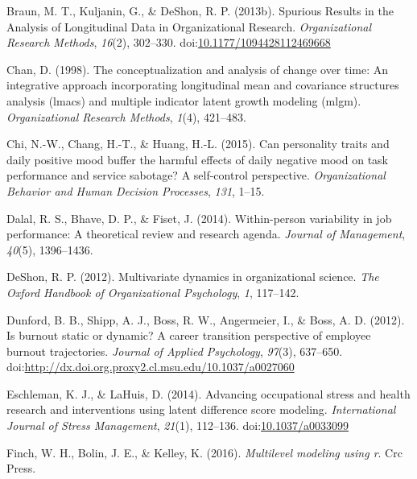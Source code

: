 \documentclass[english,,man]{apa6}
\theoremstyle{definition}
\theoremstyle{definition}
\theoremstyle{definition}
\theoremstyle{remark}
\begin{document}
\leavevmode\hypertarget{ref-braun_spurious_2013}{}%
Braun, M. T., Kuljanin, G., \& DeShon, R. P. (2013b). Spurious Results
in the Analysis of Longitudinal Data in Organizational Research.
\emph{Organizational Research Methods}, \emph{16}(2), 302--330.
doi:\href{https://doi.org/10.1177/1094428112469668}{10.1177/1094428112469668}

\leavevmode\hypertarget{ref-chan1998conceptualization}{}%
Chan, D. (1998). The conceptualization and analysis of change over time:
An integrative approach incorporating longitudinal mean and covariance
structures analysis (lmacs) and multiple indicator latent growth
modeling (mlgm). \emph{Organizational Research Methods}, \emph{1}(4),
421--483.

\leavevmode\hypertarget{ref-chi_can_2015}{}%
Chi, N.-W., Chang, H.-T., \& Huang, H.-L. (2015). Can personality traits
and daily positive mood buffer the harmful effects of daily negative
mood on task performance and service sabotage? A self-control
perspective. \emph{Organizational Behavior and Human Decision
Processes}, \emph{131}, 1--15.

\leavevmode\hypertarget{ref-dalal2014within}{}%
Dalal, R. S., Bhave, D. P., \& Fiset, J. (2014). Within-person
variability in job performance: A theoretical review and research
agenda. \emph{Journal of Management}, \emph{40}(5), 1396--1436.

\leavevmode\hypertarget{ref-deshon_multivariate_2012}{}%
DeShon, R. P. (2012). Multivariate dynamics in organizational science.
\emph{The Oxford Handbook of Organizational Psychology}, \emph{1},
117--142.

\leavevmode\hypertarget{ref-dunford_is_2012}{}%
Dunford, B. B., Shipp, A. J., Boss, R. W., Angermeier, I., \& Boss, A.
D. (2012). Is burnout static or dynamic? A career transition perspective
of employee burnout trajectories. \emph{Journal of Applied Psychology},
\emph{97}(3), 637--650.
doi:\href{https://doi.org/http://dx.doi.org.proxy2.cl.msu.edu/10.1037/a0027060}{http://dx.doi.org.proxy2.cl.msu.edu/10.1037/a0027060}

\leavevmode\hypertarget{ref-eschleman_advancing_2014}{}%
Eschleman, K. J., \& LaHuis, D. (2014). Advancing occupational stress
and health research and interventions using latent difference score
modeling. \emph{International Journal of Stress Management},
\emph{21}(1), 112--136.
doi:\href{https://doi.org/10.1037/a0033099}{10.1037/a0033099}

\leavevmode\hypertarget{ref-finch2016multilevel}{}%
Finch, W. H., Bolin, J. E., \& Kelley, K. (2016). \emph{Multilevel
modeling using r}. Crc Press.
\end{document}
